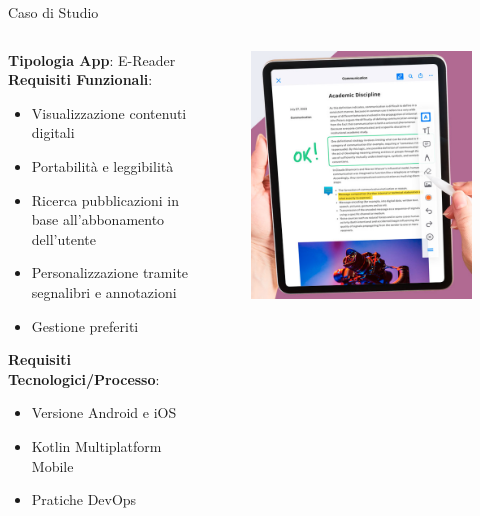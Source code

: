 \begin{frame}{Caso di Studio}
    \begin{columns}[onlytextwidth]
        \begin{column}{0.5\textwidth}
            \textbf{Tipologia App}: E-Reader\\
            \vspace{5mm}
            \textbf{Requisiti Funzionali}:
            \begin{itemize}
                \item Visualizzazione contenuti digitali
                \item Portabilità e leggibilità
                \item Ricerca pubblicazioni in base all'abbonamento dell'utente
                \item Personalizzazione tramite segnalibri e annotazioni
                \item Gestione preferiti
            \end{itemize}
            \vspace{5mm}
            \textbf{Requisiti Tecnologici/Processo}:
            \begin{itemize}
                \item Versione Android e iOS
                \item Kotlin Multiplatform Mobile
                \item Pratiche DevOps
            \end{itemize}
        \end{column}
        \begin{column}{0.45\textwidth}
             \begin{figure}[H]
                \includegraphics[width=1\textwidth]{img/e-reader.png}

\end{figure}
\end{column}
\end{columns}
\end{frame}
